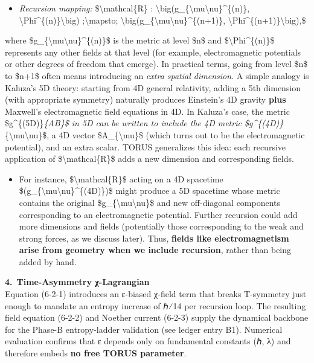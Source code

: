 \documentclass[
]{article}
\begin{document}
\begin{itemize}
\item
  \emph{Recursion mapping:} \$\textbackslash mathcal\{R\} :
  \textbackslash big(g\_\{\textbackslash mu\textbackslash nu\}\^{}\{(n)\},
  \textbackslash Phi\^{}\{(n)\}\textbackslash big)
  ;\textbackslash mapsto;
  \textbackslash big(g\_\{\textbackslash mu\textbackslash nu\}\^{}\{(n+1)\},
  \textbackslash Phi\^{}\{(n+1)\}\textbackslash big),\$
\end{itemize}

where \$g\_\{\textbackslash mu\textbackslash nu\}\^{}\{(n)\}\$ is the
metric at level \$n\$ and \$\textbackslash Phi\^{}\{(n)\}\$ represents
any other fields at that level (for example, electromagnetic potentials
or other degrees of freedom that emerge). In practical terms, going from
level \$n\$ to \$n+1\$ often means introducing an \emph{extra spatial
dimension}. A simple analogy is Kaluza's 5D theory: starting from 4D
general relativity, adding a 5th dimension (with appropriate symmetry)
naturally produces Einstein's 4D gravity \textbf{plus} Maxwell's
electromagnetic field equations in 4D\hspace{0pt}. In Kaluza's case, the
metric \$g\^{}\{(5D)\}\emph{\{AB\}\$ in 5D can be written to include the
4D metric \$g\^{}\{(4D)\}}\{\textbackslash mu\textbackslash nu\}\$, a 4D
vector \$A\_\{\textbackslash mu\}\$ (which turns out to be the
electromagnetic potential), and an extra scalar. TORUS generalizes this
idea: each recursive application of \$\textbackslash mathcal\{R\}\$ adds
a new dimension and corresponding fields.

\begin{itemize}
\item
  For instance, \$\textbackslash mathcal\{R\}\$ acting on a 4D spacetime
  \$(g\_\{\textbackslash mu\textbackslash nu\}\^{}\{(4D)\})\$ might
  produce a 5D spacetime whose metric contains the original
  \$g\_\{\textbackslash mu\textbackslash nu\}\$ and new off-diagonal
  components corresponding to an electromagnetic potential. Further
  recursion could add more dimensions and fields (potentially those
  corresponding to the weak and strong forces, as we discuss later).
  Thus, \textbf{fields like electromagnetism arise from geometry when we
  include recursion}, rather than being added by hand.
\end{itemize}

\textbf{4. Time-Asymmetry χ-Lagrangian}\\
Equation (6-2-1) introduces an ε-biased χ-field term that breaks
T-symmetry just enough to mandate an entropy increase of ℏ⁄14 per
recursion loop. The resulting field equation (6-2-2) and Noether current
(6-2-3) supply the dynamical backbone for the Phase-B entropy-ladder
validation (see ledger entry B1). Numerical evaluation confirms that ε
depends only on fundamental constants (ℏ, λ) and therefore embeds
\textbf{no free TORUS parameter}.
\end{document}
